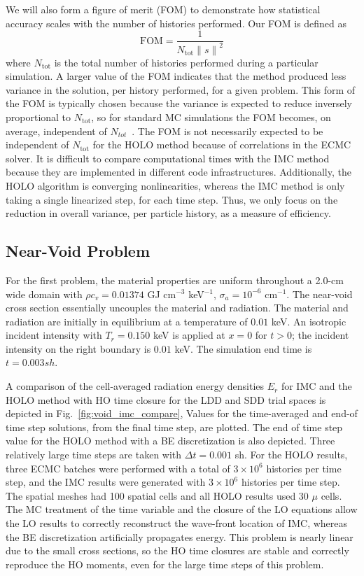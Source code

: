 \documentclass{anstrans}
\newcommand{\FOM}{\ensuremath{\text{FOM}}}
\renewcommand{\ss}{\ensuremath{\|s\|}}
\begin{document}
We will also form a figure of merit (FOM) to demonstrate how statistical accuracy
scales with the number of histories performed.  Our FOM is defined as
\begin{equation}
    \FOM = \frac{1}{N_{\text{tot}}\ss^2}
\end{equation}
where $N_{\text{tot}}$ is the total number of histories performed during a particular simulation.
A larger value of the FOM indicates that the method produced less variance in the
solution, per history performed, for a given problem.  This form of the FOM
is typically chosen because the variance is expected to reduce inversely proportional
to $N_{\text{tot}}$, so for standard MC simulations the FOM becomes, on average, independent of
$N_{tot}$~\cite{shultis_mc}.  The FOM is not necessarily expected to be independent
of $N_{\text{tot}}$ for the HOLO method because of correlations in the ECMC solver.
It is difficult to compare computational times with the IMC method because they are implemented in
different code infrastructures.  Additionally, the HOLO algorithm is converging nonlinearities,
whereas the IMC method is only taking a single linearized step, for each time step.  Thus, we only
focus on the reduction in overall variance, per particle history, as a measure of efficiency.


\subsection{Near-Void Problem}

For the first problem, the material properties
are uniform throughout a 2.0-cm wide domain with $\rho c_v = 0.01374$ GJ cm$^{-3}$ keV$^{-1}$, $\sigma_a=10^{-6}$ cm$^{-1}$.
The near-void cross section essentially uncouples the material and radiation.  
The material and radiation are initially in equilibrium at a temperature of $0.01$ keV.
An isotropic incident intensity with $T_r = 0.150$ keV is applied
at $x=0$ for $t>0$; the incident intensity on the right boundary is $0.01$ keV.  The simulation end
time is $t=0.003 sh$.  

A comparison of the cell-averaged radiation energy densities $E_r$ for IMC and the HOLO
method with HO time closure for the LDD and SDD trial spaces is depicted in Fig.~\ref{fig:void_imc_compare},
Values for the time-averaged and end-of time step solutions, from the final time
step, are plotted.  The end of time step value for the HOLO method with a BE discretization is also depicted.
Three relatively large time steps are taken with $\Delta t = 0.001$ sh.
For the HOLO results, three ECMC batches were performed with
a total of $3\times10^6$ histories per time step, and the IMC results were generated with
$3\times10^6$ histories per time step.
The spatial meshes had 100 spatial cells and all HOLO results used 30 $\mu$ cells.  
The MC treatment of the time
variable and the closure of the LO equations allow the LO results to correctly reconstruct
the wave-front location of IMC, whereas the BE discretization artificially propagates
energy. This problem is nearly linear due to the small cross sections, so the HO time closures are
stable and correctly reproduce the HO moments, even for the large time steps of this problem.
\end{document}
